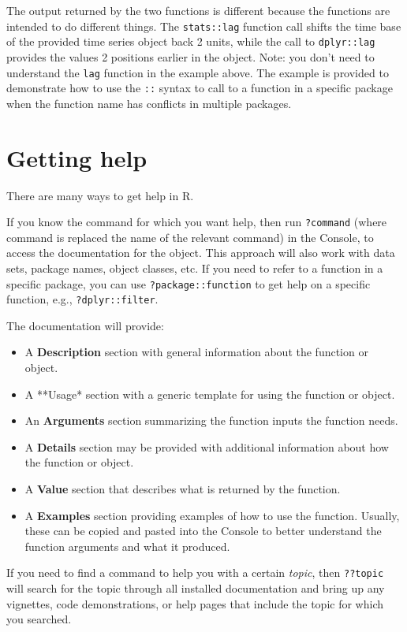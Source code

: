 \documentclass[
]{book}
\providecommand{\tightlist}{%
  \setlength{\itemsep}{0pt}\setlength{\parskip}{0pt}}
\theoremstyle{definition}
\theoremstyle{definition}
\theoremstyle{definition}
\theoremstyle{definition}
\theoremstyle{remark}
\begin{document}
The output returned by the two functions is different because the functions are intended to do different things. The \texttt{stats::lag} function call shifts the time base of the provided time series object back 2 units, while the call to \texttt{dplyr::lag} provides the values 2 positions earlier in the object. Note: you don't need to understand the \texttt{lag} function in the example above. The example is provided to demonstrate how to use the \texttt{::} syntax to call to a function in a specific package when the function name has conflicts in multiple packages.

\hypertarget{getting-help}{%
\section{Getting help}\label{getting-help}}

There are many ways to get help in R.

If you know the command for which you want help, then run \texttt{?command} (where command is replaced the name of the relevant command) in the Console, to access the documentation for the object. This approach will also work with data sets, package names, object classes, etc. If you need to refer to a function in a specific package, you can use \texttt{?package::function} to get help on a specific function, e.g., \texttt{?dplyr::filter}.

The documentation will provide:

\begin{itemize}
\tightlist
\item
  A \textbf{Description} section with general information about the function or object.
\item
  A **Usage* section with a generic template for using the function or object.
\item
  An \textbf{Arguments} section summarizing the function inputs the function needs.
\item
  A \textbf{Details} section may be provided with additional information about how the function or object.
\item
  A \textbf{Value} section that describes what is returned by the function.
\item
  A \textbf{Examples} section providing examples of how to use the function. Usually, these can be copied and pasted into the Console to better understand the function arguments and what it produced.
\end{itemize}

If you need to find a command to help you with a certain \emph{topic}, then \texttt{??topic} will search for the topic through all installed documentation and bring up any vignettes, code demonstrations, or help pages that include the topic for which you searched.
\end{document}
